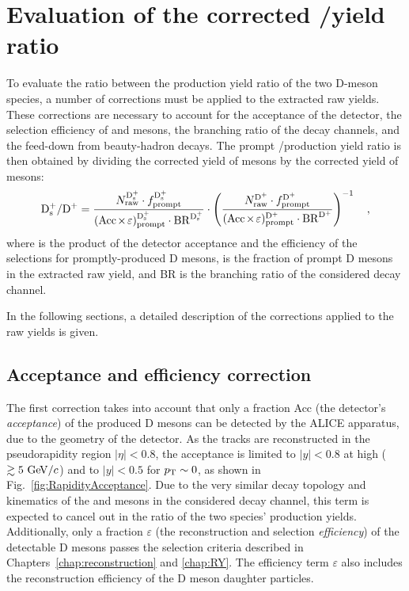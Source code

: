 \chapter{\texorpdfstring{Evaluation of the corrected \ds/\dpl yield ratio}{Evaluation of the corrected Ds+/D+ yield ratio}}\label{ch:corrections}

To evaluate the ratio between the production yield ratio of the two D-meson species, a number of corrections must be applied to the extracted raw yields. These corrections are necessary to account for the acceptance of the detector, the selection efficiency of \ds and \dpl mesons, the branching ratio of the decay channels, and the feed-down from beauty-hadron decays. The prompt \ds/\dpl production yield ratio is then obtained by dividing the corrected yield of \ds mesons by the corrected yield of \dpl mesons:
\begin{equation}\label{eq:DsDplusRatio}
        \mathrm{D_s^+}/\mathrm{D^+} = \frac{N_\mathrm{raw}^{\mathrm{D_s^+}}\cdot f_\mathrm{prompt}^\mathrm{D_s^+}}{(\mathrm{Acc}\mkern-2mu\times\mkern-2mu\varepsilon)_\mathrm{prompt}^\mathrm{D_s^+} \cdot \mathrm{BR}^\mathrm{D_s^+}} \cdot \left(\frac{N_\mathrm{raw}^{\mathrm{D^+}}\cdot f_\mathrm{prompt}^\mathrm{D^+}}{(\mathrm{Acc}\mkern-2mu\times\mkern-2mu\varepsilon)_\mathrm{prompt}^\mathrm{D^+} \cdot \mathrm{BR}^\mathrm{D^+}}\right)^{-1}\quad ,
\end{equation}
where \aeffp is the product of the detector acceptance and the efficiency of the selections for promptly-produced D mesons, \fp is the fraction of prompt D mesons in the extracted raw yield, and BR is the branching ratio of the considered decay channel. 

In the following sections, a detailed description of the corrections applied to the raw yields is given.

\section{Acceptance and efficiency correction}\label{sec:aeff}
The first correction takes into account that only a fraction Acc (the detector's \emph{acceptance}) of the produced D mesons can be detected by the ALICE apparatus, due to the geometry of the detector. As the tracks are reconstructed in the pseudorapidity region $\lvert\eta\rvert<0.8$, the acceptance is limited to $\lvert y\rvert<0.8$ at high \pt ($\gtrsim5~\mathrm{Ge\kern-.1emV}/c$) and to $\lvert y\rvert<0.5$ for $p_\mathrm{T}\sim0$, as shown in Fig.~\ref{fig:RapidityAcceptance}. Due to the very similar decay topology and kinematics of the \ds and \dpl mesons in the considered decay channel, this term is expected to cancel out in the ratio of the two species' production yields. Additionally, only a fraction $\varepsilon$ (the reconstruction and selection \emph{efficiency}) of the detectable D mesons passes the selection criteria described in Chapters~\ref{chap:reconstruction} and \ref{chap:RY}. The efficiency term $\varepsilon$ also includes the reconstruction efficiency of the D meson daughter particles.

